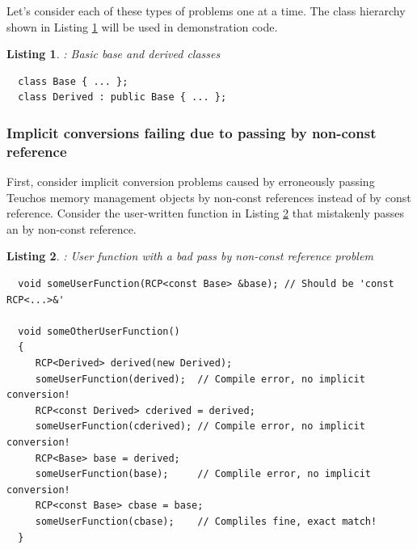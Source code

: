 \documentclass[pdf,ps2pdf,11pt]{SANDreport}
\newtheorem{listing}{Listing}
\begin{document}
Let's consider each of these types of problems one at a time.  The
class hierarchy shown in Listing {}\ref{listing:Base-Derived-Classes}
will be used in demonstration code.


{}\begin{listing}: Basic base and derived classes
\label{listing:Base-Derived-Classes}
{\small\begin{verbatim}
  class Base { ... };
  class Derived : public Base { ... };
\end{verbatim}}
\end{listing}


%
{}\subsubsection*{Implicit conversions failing due to passing by
non-const reference}
%


First, consider implicit conversion problems caused by erroneously
passing Teuchos memory management objects by non-const references
instead of by const reference.  Consider the user-written function in
Listing {}\ref{listing:someUserFunction-pass-by-non-const-ref} that
mistakenly passes an {} by non-const reference.


{}\begin{listing}: User function with a bad pass by non-const
reference problem
\label{listing:someUserFunction-pass-by-non-const-ref}
{\small\begin{verbatim}
  void someUserFunction(RCP<const Base> &base); // Should be 'const RCP<...>&'

  void someOtherUserFunction()
  {
     RCP<Derived> derived(new Derived);
     someUserFunction(derived);  // Compile error, no implicit conversion!
     RCP<const Derived> cderived = derived;
     someUserFunction(cderived); // Compile error, no implicit conversion!
     RCP<Base> base = derived;
     someUserFunction(base);     // Complile error, no implicit conversion!
     RCP<const Base> cbase = base;
     someUserFunction(cbase);    // Compliles fine, exact match!
  }
\end{verbatim}}
\end{listing}
\end{document}
